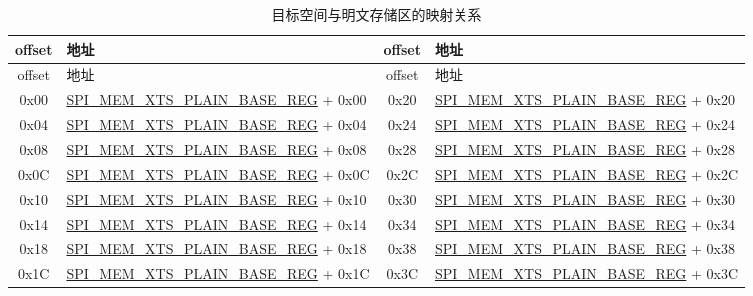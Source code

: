 \begin{longtable}[c]
{ |c|p{5.2cm} |c|p{5.2cm}|}
\caption{目标空间与明文存储区的映射关系} 
\label{tab:extmemencr-data-padding}\\
\hline 
\rowcolor{lightgray}
offset &  地址  & offset &  地址 \\\hline
\endfirsthead
\hline
\rowcolor{lightgray}
offset &  地址  & offset &  地址   \\\hline
\endhead
\endfoot
0x00 & \hyperref[regdesc:SPIMEMXTSPLAINBASEREG]{SPI\_MEM\_XTS\_PLAIN\_BASE\_REG} + 0x00 & 0x20 & \hyperref[regdesc:SPIMEMXTSPLAINBASEREG]{SPI\_MEM\_XTS\_PLAIN\_BASE\_REG} + 0x20 \\\hline 
0x04 & \hyperref[regdesc:SPIMEMXTSPLAINBASEREG]{SPI\_MEM\_XTS\_PLAIN\_BASE\_REG} + 0x04 & 0x24 & \hyperref[regdesc:SPIMEMXTSPLAINBASEREG]{SPI\_MEM\_XTS\_PLAIN\_BASE\_REG} + 0x24 \\\hline 
0x08 & \hyperref[regdesc:SPIMEMXTSPLAINBASEREG]{SPI\_MEM\_XTS\_PLAIN\_BASE\_REG} + 0x08 & 0x28 & \hyperref[regdesc:SPIMEMXTSPLAINBASEREG]{SPI\_MEM\_XTS\_PLAIN\_BASE\_REG} + 0x28 \\\hline 
0x0C & \hyperref[regdesc:SPIMEMXTSPLAINBASEREG]{SPI\_MEM\_XTS\_PLAIN\_BASE\_REG} + 0x0C & 0x2C & \hyperref[regdesc:SPIMEMXTSPLAINBASEREG]{SPI\_MEM\_XTS\_PLAIN\_BASE\_REG} + 0x2C \\\hline 
0x10 & \hyperref[regdesc:SPIMEMXTSPLAINBASEREG]{SPI\_MEM\_XTS\_PLAIN\_BASE\_REG} + 0x10 & 0x30 & \hyperref[regdesc:SPIMEMXTSPLAINBASEREG]{SPI\_MEM\_XTS\_PLAIN\_BASE\_REG} + 0x30 \\\hline 
0x14 & \hyperref[regdesc:SPIMEMXTSPLAINBASEREG]{SPI\_MEM\_XTS\_PLAIN\_BASE\_REG} + 0x14 & 0x34 & \hyperref[regdesc:SPIMEMXTSPLAINBASEREG]{SPI\_MEM\_XTS\_PLAIN\_BASE\_REG} + 0x34 \\\hline 
0x18 & \hyperref[regdesc:SPIMEMXTSPLAINBASEREG]{SPI\_MEM\_XTS\_PLAIN\_BASE\_REG} + 0x18 & 0x38 & \hyperref[regdesc:SPIMEMXTSPLAINBASEREG]{SPI\_MEM\_XTS\_PLAIN\_BASE\_REG} + 0x38 \\\hline 
0x1C & \hyperref[regdesc:SPIMEMXTSPLAINBASEREG]{SPI\_MEM\_XTS\_PLAIN\_BASE\_REG} + 0x1C & 0x3C & \hyperref[regdesc:SPIMEMXTSPLAINBASEREG]{SPI\_MEM\_XTS\_PLAIN\_BASE\_REG} + 0x3C \\\hline 
\end{longtable}
